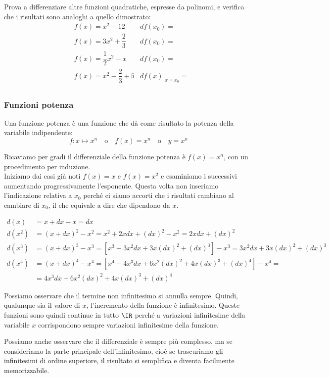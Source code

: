 Prova a differenziare altre funzioni quadratiche, espresse da polinomi,
e verifica che i risultati sono analoghi a quello dimostrato: 
\begin{align*}
&f(x) = x^2 - 12  &df(x_0)=\\
&f(x) = 3x^2 +\dfrac{2}{3}  &df(x_0)=\\
&f(x) = \dfrac{1}{2}x^2 - x  &df(x_0)=\\
&f(x) = x^2 - \dfrac{2}{3} +5 &df(x)|_{x=x_0}=\\
\end{align*}


\subsubsection{Funzioni potenza}
\label{subsubsec:diff01_diffpot}

Una funzione potenza è una funzione che dà come risultato la potenza 
della variabile indipendente:
\[f: x \mapsto x^n \quad \text{o} \quad 
  f(x)=x^n \quad \text{o} \quad 
  y = x^n\]

Ricaviamo per gradi il differenziale della funzione potenza è $f(x)=x^n$, 
con un procedimento per induzione.\\
Iniziamo dai casi già noti $f(x)=x$ e $f(x)=x^2$ e esaminiamo i successivi
aumentando progressivamente l'esponente. Questa volta non inseriamo 
l'indicazione relativa a $x_0$ perché ci siamo accorti che i risultati cambiano 
al cambiare di $x_0$, il che equivale a dire che dipendono da $x$.


\begin{align*}
  d(x) &=x+dx-x =dx\\
  d(x^2) &=(x+dx)^2-x^2 = x^2 +2xdx +(dx)^2 -x^2 = 2xdx +(dx)^2\\
  d(x^3) &=(x+dx)^3-x^3 =[x^3+3x^2dx+3x(dx)^2+(dx)^3]-x^3=
                      3x^2dx+3x(dx)^2+(dx)^3\\
  d(x^4) &=(x+dx)^4-x^4 = [x^4+4x^3dx+6x^2(dx)^2+4x(dx)^3+(dx)^4]-x^4=\\
                      &=4x^3dx+6x^2(dx)^2+4x(dx)^3+(dx)^4      
\end{align*}


Possiamo osservare che il termine non infinitesimo si annulla sempre. Quindi,
qualunque sia il valore di \(x\), l'incremento della funzione è infinitesimo. 
Queste funzioni sono quindi continue in tutto \(\IR\) perché a variazioni 
infinitesime della variabile \(x\) corrispondono sempre variazioni
infinitesime della funzione.

Possiamo anche osservare che il differenziale è sempre più complesso, ma 
se consideriamo la parte principale dell'infinitesimo, cioè se trascuriamo 
gli infinitesimi di ordine superiore, il risultato si semplifica e diventa 
facilmente memorizzabile.

